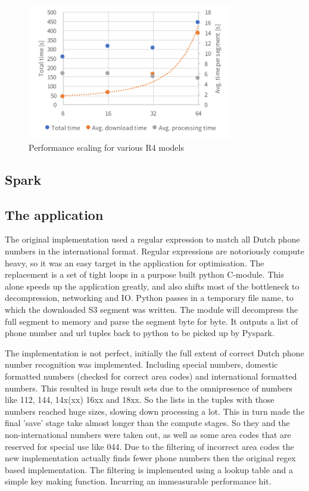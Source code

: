 \documentclass{article}
\begin{document}
\begin{figure}[H]
	\centering
	\includegraphics[width=0.8\textwidth]{resource/r4-scaling.pdf}
	\caption{Performance scaling for various R4 models}
	\label{fig:r4-scaling}
\end{figure}

\subsection{Spark}

\subsection{The application}
The original implementation used a regular expression to match all Dutch phone numbers in the international format.
Regular expressions are notoriously compute heavy, so it was an easy target in the application for optimisation.
The replacement is a set of tight loops in a purpose built python C-module.
This alone speeds up the application greatly, and also shifts most of the bottleneck to decompression, networking and IO.
Python passes in a temporary file name, to which the downloaded S3 segment was written.
The module will decompress the full segment to memory and parse the segment byte for byte.
It outputs a list of phone number and url tuples back to python to be picked up by Pyspark.

The implementation is not perfect, initially the full extent of correct Dutch phone number recognition was implemented.
Including special numbers, domestic formatted numbers (checked for correct area codes) and international formatted numbers.
This resulted in huge result sets due to the omnipresence of numbers like 112, 144, 14x(xx) 16xx and 18xx.
So the lists in the tuples with those numbers reached huge sizes, slowing down processing a lot.
This in turn made the final 'save' stage take almost longer than the compute stages.
So they and the non-international numbers were taken out, as well as some area codes that are reserved for special use like 044.
Due to the filtering of incorrect area codes the new implementation actually finds fewer phone numbers then the original regex based implementation.
The filtering is implemented using a lookup table and a simple key making function.
Incurring an immeasurable performance hit.
\end{document}
